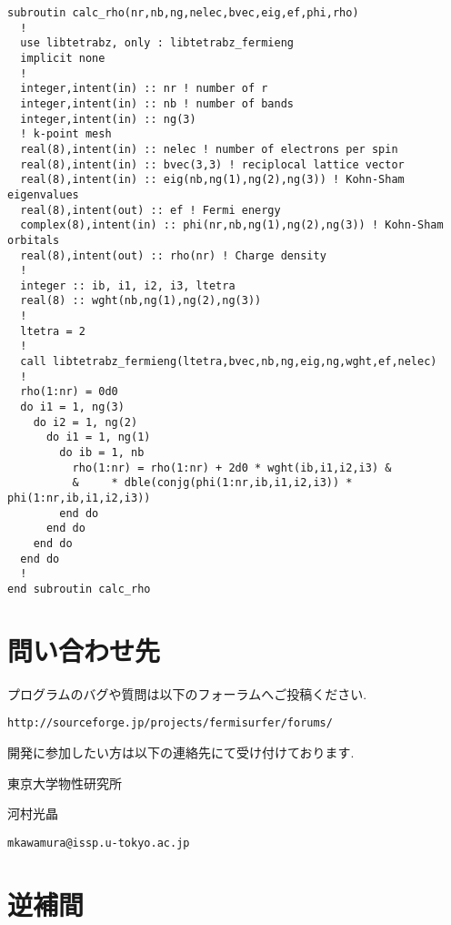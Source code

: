 \documentclass[12pt]{jarticle}
\begin{document}
\begin{verbatim}
subroutin calc_rho(nr,nb,ng,nelec,bvec,eig,ef,phi,rho)
  !
  use libtetrabz, only : libtetrabz_fermieng
  implicit none
  !
  integer,intent(in) :: nr ! number of r
  integer,intent(in) :: nb ! number of bands
  integer,intent(in) :: ng(3)
  ! k-point mesh
  real(8),intent(in) :: nelec ! number of electrons per spin
  real(8),intent(in) :: bvec(3,3) ! reciplocal lattice vector
  real(8),intent(in) :: eig(nb,ng(1),ng(2),ng(3)) ! Kohn-Sham eigenvalues
  real(8),intent(out) :: ef ! Fermi energy
  complex(8),intent(in) :: phi(nr,nb,ng(1),ng(2),ng(3)) ! Kohn-Sham orbitals
  real(8),intent(out) :: rho(nr) ! Charge density
  !
  integer :: ib, i1, i2, i3, ltetra
  real(8) :: wght(nb,ng(1),ng(2),ng(3))
  !
  ltetra = 2
  !
  call libtetrabz_fermieng(ltetra,bvec,nb,ng,eig,ng,wght,ef,nelec)
  !
  rho(1:nr) = 0d0
  do i1 = 1, ng(3)
    do i2 = 1, ng(2)
      do i1 = 1, ng(1)
        do ib = 1, nb
          rho(1:nr) = rho(1:nr) + 2d0 * wght(ib,i1,i2,i3) &
          &     * dble(conjg(phi(1:nr,ib,i1,i2,i3)) * phi(1:nr,ib,i1,i2,i3))
        end do
      end do
    end do
  end do
  !
end subroutin calc_rho
\end{verbatim}

\section{問い合わせ先}

プログラムのバグや質問は以下のフォーラムへご投稿ください.
\begin{verbatim}
http://sourceforge.jp/projects/fermisurfer/forums/
\end{verbatim}

開発に参加したい方は以下の連絡先にて受け付けております. 

東京大学物性研究所

河村光晶

\verb|mkawamura@issp.u-tokyo.ac.jp|

\appendix

\section{逆補間}
\end{document}
